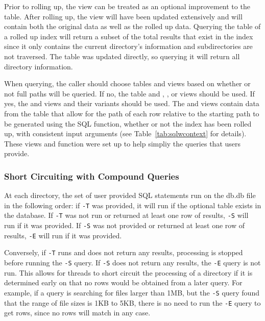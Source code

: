 Prior to rolling up, the \pentries view can be treated as an optional
improvement to the \entries table. After rolling up, the \pentries
view will have been updated extensively and will contain both the
original \entries data as well as the rolled up data. Querying the
\entries table of a rolled up index will return a subset of the total
results that exist in the index since it only contains the current
directory's information and subdirectories are not traversed. The
\summary table was updated directly, so querying it will return all
directory information.

When querying, the caller should choose tables and views based on
whether or not full paths will be queried. If no, the \summary table
and \pentries, \xpentries, or \epentries views should be used. If yes,
the \vrpentries and \vrsummary views and their variants should be
used. The \vrpentries and \vrsummary views contain data from the
\summary table that allow for the path of each row relative to the
starting path to be generated using the \rpath SQL function, whether
or not the index has been rolled up, with consistent input arguments
(see Table~\ref{tab:sqlwcontext} for details). These views and
function were set up to help simpliy the queries that users provide.

\subsubsection{Short Circuiting with Compound Queries}
At each directory, the set of user provided SQL statements run on the
db.db file in the following order: if \texttt{-T} was provided, it
will run if the optional \treesummary table exists in the database. If
\texttt{-T} was not run or returned at least one row of results,
\texttt{-S} will run if it was provided. If \texttt{-S} was not
provided or returned at least one row of results, \texttt{-E} will run
if it was provided.

Conversely, if \texttt{-T} runs and does not return any results,
processing is stopped before running the \texttt{-S} query. If
\texttt{-S} does not return any results, the \texttt{-E} query is not
run. This allows for threads to short circuit the processing of a
directory if it is determined early on that no rows would be obtained
from a later query. For example, if a query is searching for files
larger than 1MB, but the \texttt{-S} query found that the range of
file sizes is 1KB to 5KB, there is no need to run the \texttt{-E}
query to get rows, since no rows will match in any case.

